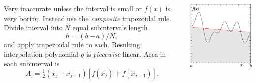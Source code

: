 \documentclass{beamer}
\begin{document}
\begin{frame}
\begin{columns}
\begin{column}{0.5\textwidth}
\begin{overlayarea}{\textwidth}{0.7\textheight}
{          Very inaccurate unless the interval is small or $f(x)$ is
          very boring.
        }
        {
          \vspace{1ex}
          Instead use the \emph{composite} trapezoidal rule. Divide
          interval into $N$ equal subintervals length
          \begin{equation*}
            h = (b - a) / N,
          \end{equation*}
          and apply trapezoidal rule to each.
        }
        {
          Resulting interpolation polynomial $g$ is
          \emph{piecewise} linear. Area in each subinterval is
          \begin{equation*}
            A_j = \tfrac{1}{2} (x_j - x_{j-1}) \left[ f(x_j) + f(x_{j-1})
            \right].
          \end{equation*}
        }
      \end{overlayarea}
    \end{column}
    \begin{column}{0.5\textwidth}
      \begin{overlayarea}{\textwidth}{0.7\textheight}
        {
          \begin{center}
            \includegraphics[width=\textwidth]{figures/trapez1}

\end{center}}
\end{overlayarea}
\end{column}
\end{columns}
\end{frame}
\end{document}
